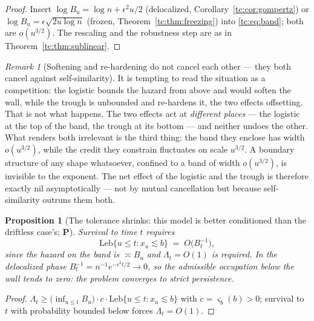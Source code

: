 \documentclass[11pt]{article}
\numberwithin{equation}{section}
\theoremstyle{plain}
\newtheorem{proposition}[theorem]{Proposition}
\theoremstyle{definition}
\theoremstyle{remark}
\newtheorem{remark}[theorem]{Remark}
\begin{document}
\begin{proof}
Insert $\log B_u=\log n+\epsilon^{2}u/2$ (delocalized,
Corollary~\ref{tc:cor:gompertz}) or
$\log B_u=\epsilon\sqrt{2u\log n}$ (frozen,
Theorem~\ref{tc:thm:freezing}) into \eqref{tc:eq:band}; both are
$o(u^{3/2})$. The rescaling and the robustness step are as in
Theorem~\ref{tc:thm:sublinear}.
\end{proof}

\begin{remark}[Softening and re-hardening do not cancel each other ---
they both cancel against self-similarity]\label{tc:rem:netcancel}
It is tempting to read the situation as a competition: the logistic
bounds the hazard from above and would soften the wall, while the trough
is unbounded and re-hardens it, the two effects offsetting. That is not
what happens. The two effects act at \emph{different places} --- the
logistic at the top of the band, the trough at its bottom --- and
neither undoes the other. What renders both irrelevant is the third
thing: the band they enclose has width $o(u^{3/2})$, while the credit
they constrain fluctuates on scale $u^{3/2}$. A boundary structure of
any shape whatsoever, confined to a band of width $o(u^{3/2})$, is
invisible to the exponent. The net effect of the logistic and the trough
is therefore exactly nil asymptotically --- not by mutual cancellation
but because self-similarity outruns them both.
\end{remark}

\begin{proposition}[The tolerance shrinks: this model is better
conditioned than the driftless case's; \textbf{P}]\label{tc:prop:tolerance}
Survival to time $t$ requires
\begin{equation}\label{tc:eq:tolerance}
\mathrm{Leb}\{u\le t:x_u\lesssim b\}\;=\;O\!\bigl(B_t^{-1}\bigr),
\end{equation}
since the hazard on the band is $\asymp B_u$ and $\Lambda_t=O(1)$ is
required. In the delocalized phase $B_t^{-1}=n^{-1}e^{-\epsilon^{2}t/2}
\to0$, so the admissible occupation below the wall tends to zero: the
problem converges to \emph{strict} persistence.
\end{proposition}

\begin{proof}
$\Lambda_t\ge\bigl(\inf_{u\le t}B_u\bigr)\cdot c\cdot
\mathrm{Leb}\{u\le t:x_u\lesssim b\}$ with $c=\varsigma_b(b)>0$;
survival to $t$ with probability bounded below forces $\Lambda_t=O(1)$.
\end{proof}
\end{document}
